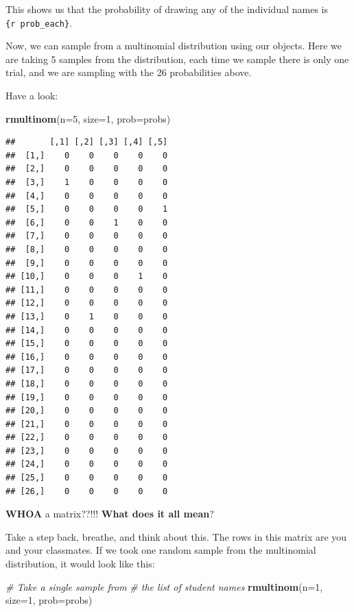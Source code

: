 \documentclass[
]{book}
\newenvironment{Shaded}{\begin{snugshade}}{\end{snugshade}}
\newcommand{\CommentTok}[1]{\textcolor[rgb]{0.56,0.35,0.01}{\textit{#1}}}
\newcommand{\DataTypeTok}[1]{\textcolor[rgb]{0.13,0.29,0.53}{#1}}
\newcommand{\DecValTok}[1]{\textcolor[rgb]{0.00,0.00,0.81}{#1}}
\newcommand{\KeywordTok}[1]{\textcolor[rgb]{0.13,0.29,0.53}{\textbf{#1}}}
\newcommand{\NormalTok}[1]{#1}
\begin{document}
This shows us that the probability of drawing any of the individual names is \texttt{\{r\ prob\_each\}}.

Now, we can sample from a multinomial distribution using our objects. Here we are taking 5 samples from the distribution, each time we sample there is only one trial, and we are sampling with the 26 probabilities above.

Have a look:

\begin{Shaded}
\begin{Highlighting}[]
\KeywordTok{rmultinom}\NormalTok{(}\DataTypeTok{n=}\DecValTok{5}\NormalTok{, }\DataTypeTok{size=}\DecValTok{1}\NormalTok{, }\DataTypeTok{prob=}\NormalTok{probs)}
\end{Highlighting}
\end{Shaded}

\begin{verbatim}
##       [,1] [,2] [,3] [,4] [,5]
##  [1,]    0    0    0    0    0
##  [2,]    0    0    0    0    0
##  [3,]    1    0    0    0    0
##  [4,]    0    0    0    0    0
##  [5,]    0    0    0    0    1
##  [6,]    0    0    1    0    0
##  [7,]    0    0    0    0    0
##  [8,]    0    0    0    0    0
##  [9,]    0    0    0    0    0
## [10,]    0    0    0    1    0
## [11,]    0    0    0    0    0
## [12,]    0    0    0    0    0
## [13,]    0    1    0    0    0
## [14,]    0    0    0    0    0
## [15,]    0    0    0    0    0
## [16,]    0    0    0    0    0
## [17,]    0    0    0    0    0
## [18,]    0    0    0    0    0
## [19,]    0    0    0    0    0
## [20,]    0    0    0    0    0
## [21,]    0    0    0    0    0
## [22,]    0    0    0    0    0
## [23,]    0    0    0    0    0
## [24,]    0    0    0    0    0
## [25,]    0    0    0    0    0
## [26,]    0    0    0    0    0
\end{verbatim}

\textbf{WHOA} a matrix??!!! \textbf{What does it all mean}?

Take a step back, breathe, and think about this. The rows in this matrix are you and your classmates. If we took one random sample from the multinomial distribution, it would look like this:

\begin{Shaded}
\begin{Highlighting}[]
\CommentTok{# Take a single sample from}
\CommentTok{# the list of student names    }
\KeywordTok{rmultinom}\NormalTok{(}\DataTypeTok{n=}\DecValTok{1}\NormalTok{, }\DataTypeTok{size=}\DecValTok{1}\NormalTok{, }\DataTypeTok{prob=}\NormalTok{probs)}
\end{Highlighting}
\end{Shaded}
\end{document}
